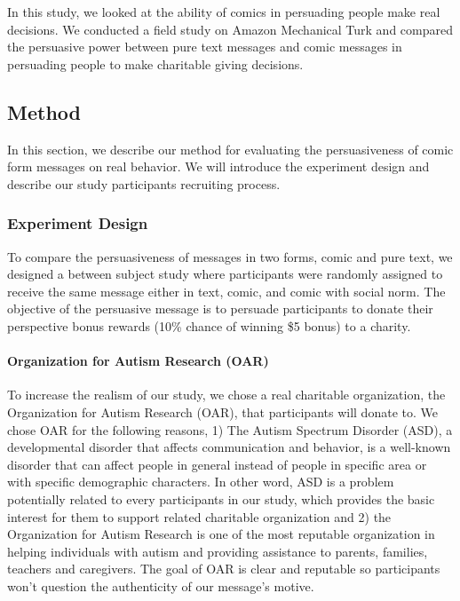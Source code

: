 In this study, we looked at the ability of comics in persuading people make real decisions. We conducted a field study on Amazon Mechanical Turk and compared the persuasive power between pure text messages and comic messages in persuading people to make charitable giving decisions.

\subsection{Method}
\label{sec:Method}
In this section, we describe our method for evaluating the persuasiveness of comic form messages on real behavior. We will introduce the experiment design and describe our study participants recruiting process.

\subsubsection{Experiment Design}
To compare the persuasiveness of messages in two forms, comic and pure text, we designed a between subject study where participants were randomly assigned to receive the same message either in text, comic, and comic with social norm. The objective of the persuasive message is to persuade participants to donate their perspective bonus rewards (10\% chance of winning \$5 bonus) to a charity.

\paragraph{Organization for Autism Research (OAR)}

To increase the realism of our study, we chose a real charitable organization, the Organization for Autism Research (OAR), that participants will donate to. We chose OAR for the following reasons, 1) The Autism Spectrum Disorder (ASD), a developmental disorder that affects communication and behavior, is a well-known disorder that can affect people in general instead of people in specific area or with specific demographic characters. In other word, ASD is a problem potentially related to every participants in our study, which provides the basic interest for them to support related charitable organization and 2) the Organization for Autism Research is one of the most reputable organization in helping individuals with autism and providing assistance to parents, families, teachers and caregivers. The goal of OAR is clear and reputable so participants won't question the authenticity of our message's motive.

